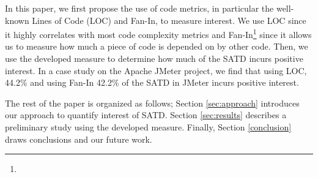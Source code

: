 In this paper, we first propose the use of code metrics, in particular the well-known Lines of Code (LOC) and Fan-In, to measure interest. We use LOC since it highly correlates with most code complexity metrics  and Fan-In\footnote{} since it allows us to measure how much a piece of code is depended on by other code. Then, we use the developed measure to determine how much of the SATD incurs positive interest. In a case study on the Apache JMeter project, we find that using LOC, 44.2\% and using Fan-In 42.2\% of the SATD in JMeter incurs positive interest.

The rest of the paper is organized as follows; Section \ref{sec:approach} introduces our approach to quantify interest of SATD. Section \ref{sec:results} describes a preliminary study using the developed measure. Finally, Section \ref{conclusion} draws conclusions and our future work.
